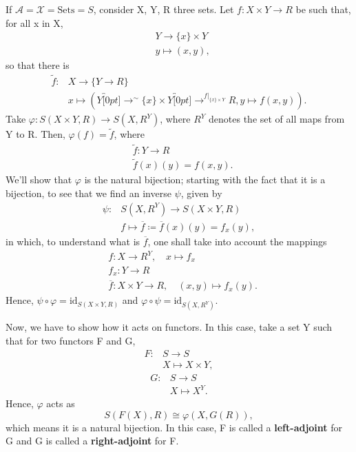 \documentclass[../category_theory.tex]{subfiles}
\begin{document}
\begin{example}
	If \(\mathcal{A}=\mathcal{X}=\mathrm{Sets}=S\), consider X, Y, R three sets. Let \(f:X\times Y\rightarrow R\) be such that, for all x in X,
	\begin{align*}
		 & Y\rightarrow  \{x\}\times Y \\
		 & y\mapsto (x, y),
	\end{align*}
	so that there is
	\begin{align*}
		\tilde f: & X\rightarrow \{Y\rightarrow R\}                                                                                                                \\
		          & x\mapsto (Y\overbracket[0pt]{\longrightarrow}^{\sim }\{x\}\times Y\overbracket[0pt]{\longrightarrow}^{f|_{\{x\}\times Y}}R, y\mapsto f(x, y)).
	\end{align*}
	Take \(\varphi :S(X\times Y, R)\rightarrow S(X, R^{Y}) \), where \(R^{Y}\) denotes the set of all maps from Y to R. Then, \(\varphi(f)=\tilde f\), where
	\begin{align*}
		 & \tilde f:Y\rightarrow R \\
		 & \tilde f(x)(y)=f(x, y).
	\end{align*}
	We'll show that \(\varphi \) is the natural bijection; starting with the fact that it is a bijection, to see that we find an inverse \(\psi\), given by
	\begin{align*}
		\psi: & S(X, R^{Y})\rightarrow S(X\times Y, R)                      \\
		      & f\mapsto \overline{f}\coloneqq \overline{f}(x)(y)=f_{x}(y),
	\end{align*}
	in which, to understand what is \(\overline{f}\), one shall take into account the mappings
	\begin{align*}
		 & f:X\rightarrow R^{Y},\quad x\mapsto f_{x}                         \\
		 & f_{x}:Y\rightarrow R                                              \\
		 & \overline{f}:X\times Y\rightarrow R,\quad (x, y)\mapsto f_{x}(y).
	\end{align*}
	Hence, \(\psi\circ \varphi = \mathrm{id}_{S(X\times Y, R)}\) and \(\varphi \circ \psi = \mathrm{id}_{S(X, R^{Y})}\).

	Now, we have to show how it acts on functors. In this case, take a set Y such that for two functors F and G,
	\begin{align*}
		F: & S\rightarrow S      \\
		   & X\mapsto X\times Y,
	\end{align*}
	\begin{align*}
		G: & S\rightarrow S  \\
		   & X\mapsto X^{Y}.
	\end{align*}
	Hence, \(\varphi \) acts as
	\[
		S(F(X), R)\cong \varphi (X, G(R)),
	\]
	which means it is a natural bijection. In this case, F is called a \textbf{left-adjoint} for G and G is called a \textbf{right-adjoint} for F.
\end{example}
\end{document}
